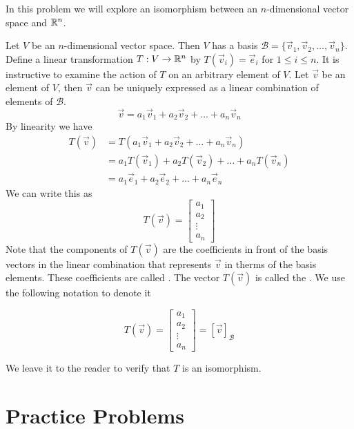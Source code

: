 \documentclass{ximera}
\begin{document}

\begin{initprob}\label{init:coordmapping} In this problem we will explore an isomorphism between an $n$-dimensional vector space and $\mathbb{R}^n$.

Let $V$ be an $n$-dimensional vector space.  Then $V$ has a basis $\mathcal{B}=\{\vec{v}_1, \vec{v}_2,\ldots ,\vec{v}_n\}$.  Define a linear transformation $T:V\rightarrow \mathbb{R}^n$ by $T(\vec{v}_i)=\vec{e}_i$ for $1\leq i\leq n$.
It is instructive to examine the action of $T$ on an arbitrary element of $V$.  Let $\vec{v}$ be an element of $V$, then $\vec{v}$ can be uniquely expressed as a linear combination of elements of $\mathcal{B}$.
$$\vec{v}=a_1\vec{v}_1+a_2\vec{v}_2+\ldots +a_n\vec{v}_n$$
By linearity we have
\begin{align*}
T(\vec{v})&=T(a_1\vec{v}_1+a_2\vec{v}_2+\ldots +a_n\vec{v}_n)\\
&=a_1T(\vec{v}_1)+a_2T(\vec{v}_2)+\ldots +a_nT(\vec{v}_n)\\
&=a_1\vec{e}_1+a_2\vec{e}_2+\ldots +a_n\vec{e}_n
\end{align*}
We can write this as $$T(\vec{v})=\begin{bmatrix}a_1\\a_2\\\vdots\\a_n\end{bmatrix}$$
Note that the components of $T(\vec{v})$ are the coefficients in front of the basis vectors in the linear combination that represents $\vec{v}$ in therms of the basis elements.  These coefficients are called .  The vector $T(\vec{v})$  is called the . We use the following notation to denote it

$$T(\vec{v})=\begin{bmatrix}a_1\\a_2\\\vdots\\a_n\end{bmatrix}=[\vec{v}]_{\mathcal{B}}$$

We leave it to the reader to verify that $T$ is an isomorphism.

\end{initprob}



\section*{Practice Problems}
\end{document}
